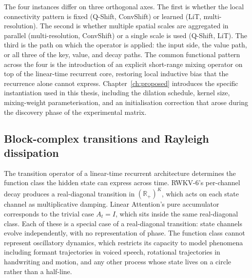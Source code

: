 The four instances differ on three orthogonal axes. The first is
whether the local connectivity pattern is fixed (Q-Shift, ConvShift)
or learned (LiT, multi-resolution). The second is whether multiple
spatial scales are aggregated in parallel (multi-resolution,
ConvShift) or a single scale is used (Q-Shift, LiT). The third is the
path on which the operator is applied: the input side, the value
path, or all three of the key, value, and decay paths. The common
functional pattern across the four is the introduction of an explicit
short-range mixing operator on top of the linear-time recurrent core,
restoring local inductive bias that the recurrence alone cannot
express. Chapter~\ref{ch:proposed} introduces the specific
instantiation used in this thesis, including the dilation schedule,
kernel size, mixing-weight parameterisation, and an initialisation
correction that arose during the discovery phase of the experimental
matrix.

\subsection{Block-complex transitions and Rayleigh dissipation}\label{sec:primitives:dho}

The transition operator of a linear-time recurrent architecture
determines the function class the hidden state can express across
time. RWKV-6's per-channel decay produces a real-diagonal transition
in $(\mathbb{R}_{+})^{K}$, which acts on each state channel as
multiplicative damping. Linear Attention's pure accumulator
corresponds to the trivial case $A_{t} = I$, which sits inside the
same real-diagonal class. Each of these is a special case of a
real-diagonal transition: state channels evolve independently, with
no representation of phase. The function class cannot represent
oscillatory dynamics, which restricts its capacity to model phenomena
including formant trajectories in voiced speech, rotational
trajectories in handwriting and motion, and any other process whose
state lives on a circle rather than a half-line.

